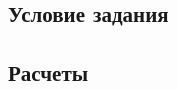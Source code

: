 \chapter{}
\label{ch:chap2}

\section{Условие задания}
\label{sec:cond2}

\section{Расчеты}
\label{sec:calc2}


\endinput